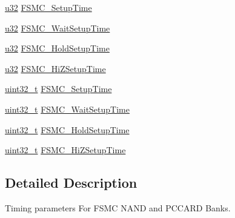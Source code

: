 \begin{DoxyCompactItemize}
\item 
\hyperlink{agilefox_2library_2inc_2stm32f10x__type_8h_a2caf5cd7bcdbe1eefa727f44ffb10bac}{u32} \hyperlink{struct_f_s_m_c___n_a_n_d___p_c_c_a_r_d_timing_init_type_def_a2f2f96aec515be3723d00001b0e48588}{F\+S\+M\+C\+\_\+\+Setup\+Time}
\item 
\hyperlink{agilefox_2library_2inc_2stm32f10x__type_8h_a2caf5cd7bcdbe1eefa727f44ffb10bac}{u32} \hyperlink{struct_f_s_m_c___n_a_n_d___p_c_c_a_r_d_timing_init_type_def_af703ccfa630069959b92496187c2b565}{F\+S\+M\+C\+\_\+\+Wait\+Setup\+Time}
\item 
\hyperlink{agilefox_2library_2inc_2stm32f10x__type_8h_a2caf5cd7bcdbe1eefa727f44ffb10bac}{u32} \hyperlink{struct_f_s_m_c___n_a_n_d___p_c_c_a_r_d_timing_init_type_def_a3d7403ba2728c0cb841d1b58877843c8}{F\+S\+M\+C\+\_\+\+Hold\+Setup\+Time}
\item 
\hyperlink{agilefox_2library_2inc_2stm32f10x__type_8h_a2caf5cd7bcdbe1eefa727f44ffb10bac}{u32} \hyperlink{struct_f_s_m_c___n_a_n_d___p_c_c_a_r_d_timing_init_type_def_aac7c41617e579fd5187e0a2d6b167490}{F\+S\+M\+C\+\_\+\+Hi\+Z\+Setup\+Time}
\item 
\hyperlink{_p_e___types_8h_a33594304e786b158f3fb30289278f5af}{uint32\+\_\+t} \hyperlink{struct_f_s_m_c___n_a_n_d___p_c_c_a_r_d_timing_init_type_def_a31632aeb49269a29a39e3b191590b6dc}{F\+S\+M\+C\+\_\+\+Setup\+Time}
\item 
\hyperlink{_p_e___types_8h_a33594304e786b158f3fb30289278f5af}{uint32\+\_\+t} \hyperlink{struct_f_s_m_c___n_a_n_d___p_c_c_a_r_d_timing_init_type_def_a99a7d54ed2674faa5a4e0f2669812855}{F\+S\+M\+C\+\_\+\+Wait\+Setup\+Time}
\item 
\hyperlink{_p_e___types_8h_a33594304e786b158f3fb30289278f5af}{uint32\+\_\+t} \hyperlink{struct_f_s_m_c___n_a_n_d___p_c_c_a_r_d_timing_init_type_def_ae2b53c2cfd55ff277f453613dcf7c8b2}{F\+S\+M\+C\+\_\+\+Hold\+Setup\+Time}
\item 
\hyperlink{_p_e___types_8h_a33594304e786b158f3fb30289278f5af}{uint32\+\_\+t} \hyperlink{struct_f_s_m_c___n_a_n_d___p_c_c_a_r_d_timing_init_type_def_a8a2a2a9e71dbf276fddad2bb32c0d256}{F\+S\+M\+C\+\_\+\+Hi\+Z\+Setup\+Time}
\end{DoxyCompactItemize}


\subsection{Detailed Description}
Timing parameters For F\+S\+MC N\+A\+ND and P\+C\+C\+A\+RD Banks. 

